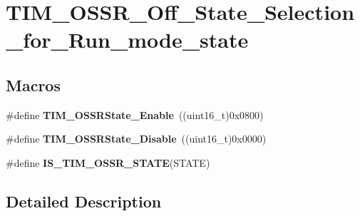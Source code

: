 \hypertarget{group___t_i_m___o_s_s_r___off___state___selection__for___run__mode__state}{\section{T\-I\-M\-\_\-\-O\-S\-S\-R\-\_\-\-Off\-\_\-\-State\-\_\-\-Selection\-\_\-for\-\_\-\-Run\-\_\-mode\-\_\-state}
\label{group___t_i_m___o_s_s_r___off___state___selection__for___run__mode__state}
}
\subsection*{Macros}
\begin{DoxyCompactItemize}
\item 
\hypertarget{group___t_i_m___o_s_s_r___off___state___selection__for___run__mode__state_ga3703ba6189db045bec48c864289f997e}{\#define {\bfseries T\-I\-M\-\_\-\-O\-S\-S\-R\-State\-\_\-\-Enable}~((uint16\-\_\-t)0x0800)}\label{group___t_i_m___o_s_s_r___off___state___selection__for___run__mode__state_ga3703ba6189db045bec48c864289f997e}

\item 
\hypertarget{group___t_i_m___o_s_s_r___off___state___selection__for___run__mode__state_ga766dfd8b3c32ec1b8b446f0e2dbe7b97}{\#define {\bfseries T\-I\-M\-\_\-\-O\-S\-S\-R\-State\-\_\-\-Disable}~((uint16\-\_\-t)0x0000)}\label{group___t_i_m___o_s_s_r___off___state___selection__for___run__mode__state_ga766dfd8b3c32ec1b8b446f0e2dbe7b97}

\item 
\#define {\bfseries I\-S\-\_\-\-T\-I\-M\-\_\-\-O\-S\-S\-R\-\_\-\-S\-T\-A\-T\-E}(S\-T\-A\-T\-E)
\end{DoxyCompactItemize}


\subsection{Detailed Description}



